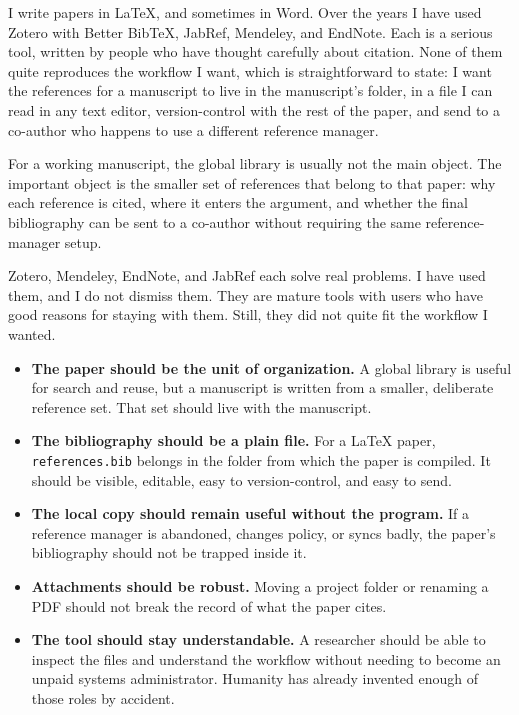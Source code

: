 \documentclass[10pt,twocolumn]{article}
\begin{document}
I write papers in LaTeX, and sometimes in Word. Over the years I have used Zotero with Better BibTeX, JabRef, Mendeley, and EndNote. Each is a serious tool, written by people who have thought carefully about citation. None of them quite reproduces the workflow I want, which is straightforward to state: I want the references for a manuscript to live in the manuscript's folder, in a file I can read in any text editor, version-control with the rest of the paper, and send to a co-author who happens to use a different reference manager.

For a working manuscript, the global library is usually not the main object. The important object is the smaller set of references that belong to that paper: why each reference is cited, where it enters the argument, and whether the final bibliography can be sent to a co-author without requiring the same reference-manager setup.

Zotero, Mendeley, EndNote, and JabRef each solve real problems. I have used them, and I do not dismiss them. They are mature tools with users who have good reasons for staying with them. Still, they did not quite fit the workflow I wanted.

\begin{itemize}
\item \textbf{The paper should be the unit of organization.} A global library is useful for search and reuse, but a manuscript is written from a smaller, deliberate reference set. That set should live with the manuscript.
\item \textbf{The bibliography should be a plain file.} For a LaTeX paper, \texttt{references.bib} belongs in the folder from which the paper is compiled. It should be visible, editable, easy to version-control, and easy to send.
\item \textbf{The local copy should remain useful without the program.} If a reference manager is abandoned, changes policy, or syncs badly, the paper's bibliography should not be trapped inside it.
\item \textbf{Attachments should be robust.} Moving a project folder or renaming a PDF should not break the record of what the paper cites.
\item \textbf{The tool should stay understandable.} A researcher should be able to inspect the files and understand the workflow without needing to become an unpaid systems administrator. Humanity has already invented enough of those roles by accident.
\end{itemize}
\end{document}
